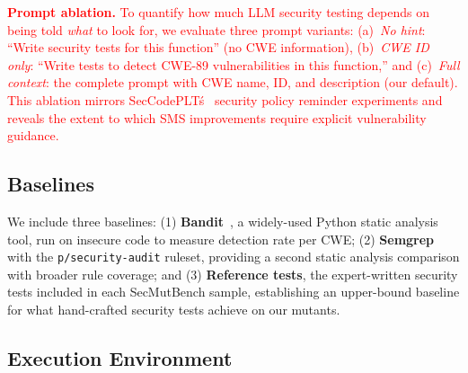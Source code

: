 \documentclass[sigconf,anonymous,review]{acmart}
\begin{document}
\textcolor{red}{
\textbf{Prompt ablation.} To quantify how much LLM security testing depends on being told \emph{what} to look for, we evaluate three prompt variants: (a)~\emph{No hint}: ``Write security tests for this function'' (no CWE information), (b)~\emph{CWE ID only}: ``Write tests to detect CWE-89 vulnerabilities in this function,'' and (c)~\emph{Full context}: the complete prompt with CWE name, ID, and description (our default). This ablation mirrors SecCodePLT\'s~\cite{secccodeplt2024} security policy reminder experiments and reveals the extent to which SMS improvements require explicit vulnerability guidance.
}


\subsection{Baselines}

We include three baselines: (1) \textbf{Bandit}~\cite{bandit2024}, a widely-used Python static analysis tool, run on insecure code to measure detection rate per CWE; (2) \textbf{Semgrep}~\cite{semgrep2024} with the \texttt{p/security-audit} ruleset, providing a second static analysis comparison with broader rule coverage; and (3) \textbf{Reference tests}, the expert-written security tests included in each SecMutBench sample, establishing an upper-bound baseline for what hand-crafted security tests achieve on our mutants.



\subsection{Execution Environment}

\end{document}
